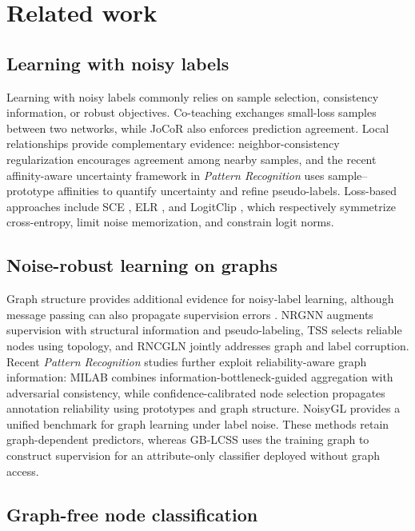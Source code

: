 \documentclass[times,review,10pt]{elsarticle}
\theoremstyle{definition}
\theoremstyle{plain}
\begin{document}
\section{Related work}\label{sec:2}

\subsection{Learning with noisy labels}\label{sec:2.1}

Learning with noisy labels commonly relies on sample selection, consistency information, or robust objectives. Co-teaching \cite{ref17} exchanges small-loss samples between two networks, while JoCoR \cite{ref18} also enforces prediction agreement. Local relationships provide complementary evidence: neighbor-consistency regularization \cite{ref10} encourages agreement among nearby samples, and the recent affinity-aware uncertainty framework in \emph{Pattern Recognition} \cite{pr2026auq} uses sample--prototype affinities to quantify uncertainty and refine pseudo-labels. Loss-based approaches include SCE \cite{ref23}, ELR \cite{ref24}, and LogitClip \cite{ref26}, which respectively symmetrize cross-entropy, limit noise memorization, and constrain logit norms.

\subsection{Noise-robust learning on graphs}\label{sec:2.2}

Graph structure provides additional evidence for noisy-label learning, although message passing can also propagate supervision errors \cite{ref6}. NRGNN \cite{ref7} augments supervision with structural information and pseudo-labeling, TSS \cite{ref9} selects reliable nodes using topology, and RNCGLN \cite{ref33} jointly addresses graph and label corruption. Recent \emph{Pattern Recognition} studies further exploit reliability-aware graph information: MILAB \cite{ref38} combines information-bottleneck-guided aggregation with adversarial consistency, while confidence-calibrated node selection \cite{pr2026llm} propagates annotation reliability using prototypes and graph structure. NoisyGL \cite{ref6} provides a unified benchmark for graph learning under label noise. These methods retain graph-dependent predictors, whereas GB-LCSS uses the training graph to construct supervision for an attribute-only classifier deployed without graph access.

\subsection{Graph-free node classification}\label{sec:2.3}
\end{document}
